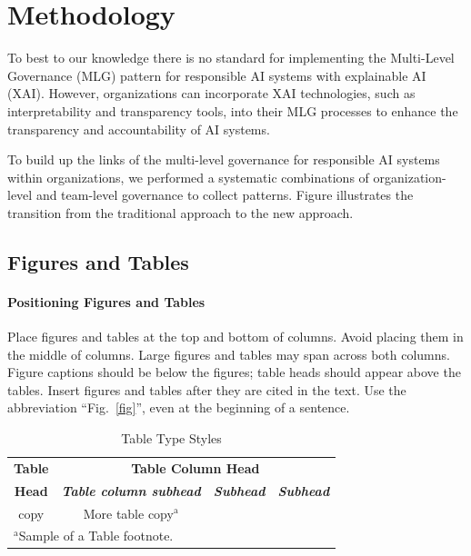 \documentclass[conference]{IEEEtran}
\begin{document}
\section{Methodology}
To best to our knowledge there is no standard for implementing the Multi-Level Governance (MLG) pattern for responsible AI systems with explainable AI (XAI). However, organizations can incorporate XAI technologies, such as interpretability and transparency tools, into their MLG processes to enhance the transparency and accountability of AI systems.

To build up the links of the multi-level governance for responsible AI systems within organizations, we performed a systematic combinations of organization-level and team-level governance to collect patterns. Figure illustrates the transition from the traditional approach to the new approach.


\subsection{Figures and Tables}
\paragraph{Positioning Figures and Tables} Place figures and tables at the top and 
bottom of columns. Avoid placing them in the middle of columns. Large 
figures and tables may span across both columns. Figure captions should be 
below the figures; table heads should appear above the tables. Insert 
figures and tables after they are cited in the text. Use the abbreviation 
``Fig.~\ref{fig}'', even at the beginning of a sentence.

\begin{table}[htbp]
\caption{Table Type Styles}
\begin{center}
\begin{tabular}{|c|c|c|c|}
\hline
\textbf{Table}&\multicolumn{3}{|c|}{\textbf{Table Column Head}} \\
\cline{2-4} 
\textbf{Head} & \textbf{\textit{Table column subhead}}& \textbf{\textit{Subhead}}& \textbf{\textit{Subhead}} \\
\hline
copy& More table copy$^{\mathrm{a}}$& &  \\
\hline
\multicolumn{4}{l}{$^{\mathrm{a}}$Sample of a Table footnote.}
\end{tabular}
\label{tab1}
\end{center}
\end{table}
\end{document}
